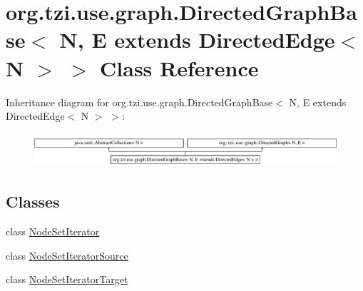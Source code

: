 \hypertarget{classorg_1_1tzi_1_1use_1_1graph_1_1_directed_graph_base_3_01_n_00_01_e_01extends_01_directed_edge_3_01_n_01_4_01_4}{\section{org.\-tzi.\-use.\-graph.\-Directed\-Graph\-Base$<$ N, E extends Directed\-Edge$<$ N $>$ $>$ Class Reference}
\label{classorg_1_1tzi_1_1use_1_1graph_1_1_directed_graph_base_3_01_n_00_01_e_01extends_01_directed_edge_3_01_n_01_4_01_4}
}
Inheritance diagram for org.\-tzi.\-use.\-graph.\-Directed\-Graph\-Base$<$ N, E extends Directed\-Edge$<$ N $>$ $>$\-:\begin{figure}[H]
\begin{center}
\leavevmode
\includegraphics[height=1.261261cm]{classorg_1_1tzi_1_1use_1_1graph_1_1_directed_graph_base_3_01_n_00_01_e_01extends_01_directed_edge_3_01_n_01_4_01_4}
\end{center}
\end{figure}
\subsection*{Classes}
\begin{DoxyCompactItemize}
\item 
class \hyperlink{classorg_1_1tzi_1_1use_1_1graph_1_1_directed_graph_base_3_01_n_00_01_e_01extends_01_directed_edgbaf8745f85cce6e8c1e3fafdeb83c711}{Node\-Set\-Iterator}
\item 
class \hyperlink{classorg_1_1tzi_1_1use_1_1graph_1_1_directed_graph_base_3_01_n_00_01_e_01extends_01_directed_edg13245e53183027847904400cecaf7471}{Node\-Set\-Iterator\-Source}
\item 
class \hyperlink{classorg_1_1tzi_1_1use_1_1graph_1_1_directed_graph_base_3_01_n_00_01_e_01extends_01_directed_edga0eb44a48d9f4b55d4eaf2f0e7c0b6a9}{Node\-Set\-Iterator\-Target}
\end{DoxyCompactItemize}
